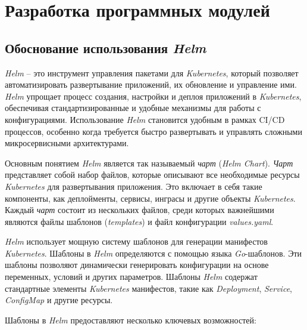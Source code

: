 \section{Разработка программных модулей}

\subsection{Обоснование использования \textit{Helm}}

\textit{Helm} -- это инструмент управления пакетами для \textit{Kubernetes}, который позволяет автоматизировать развертывание приложений, их обновление и управление ими. \textit{Helm} упрощает процесс создания, настройки и деплоя приложений в \textit{Kubernetes}, обеспечивая стандартизированные и удобные механизмы для работы с конфигурациями. Использование \textit{Helm} становится удобным в рамках CI/CD процессов, особенно когда требуется быстро развертывать и управлять сложными микросервисными архитектурами.

Основным понятием \textit{Helm} является так называемый \textit{чарт} (\textit{Helm Chart}). \textit{Чарт} представляет собой набор файлов, которые описывают все необходимые ресурсы \textit{Kubernetes} для развертывания приложения. Это включает в себя такие компоненты, как деплойменты, сервисы, инграсы и другие объекты \textit{Kubernetes}. Каждый \textit{чарт} состоит из нескольких файлов, среди которых важнейшими являются файлы шаблонов (\textit{templates}) и файл конфигурации \textit{values.yaml}.

\textit{Helm} использует мощную систему шаблонов для генерации манифестов \textit{Kubernetes}. Шаблоны в \textit{Helm} определяются с помощью языка \textit{Go}-шаблонов. Эти шаблоны позволяют динамически генерировать конфигурации на основе переменных, условий и других параметров. Шаблоны \textit{Helm} содержат стандартные элементы \textit{Kubernetes} манифестов, такие как \textit{Deployment}, \textit{Service}, \textit{ConfigMap} и другие ресурсы. 

Шаблоны в \textit{Helm} предоставляют несколько ключевых возможностей:

